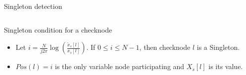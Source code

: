 \documentclass[10pt,xcolor=table]{beamer}
\begin{document}
\begin{frame}{Singleton detection}
\begin{columns}
			\end{columns}
			\begin{block}{Singleton condition for a checknode}
			\begin{itemize}
				\item Let $i=\frac{N}{j2\pi} \log(\frac{\tilde{x}_s[l]}{x_s[l]})$. If {\color{blue} $0 \leq i \leq N-1$}, then checknode $l$ is a \alert{Singleton}.\\
				\item $Pos(l) = i$ is the only variable node participating and $X_s[l]$ is its value.
			\end{itemize}
				
			\end{block}
			
	\end{frame}	
\end{document}

